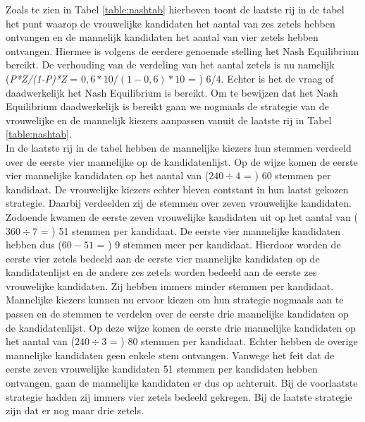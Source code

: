 Zoals te zien in Tabel \ref{table:nashtab} hierboven toont de laatste rij in de tabel het punt waarop de vrouwelijke kandidaten het aantal van zes zetels hebben ontvangen en de mannelijk kandidaten het aantal van vier zetels hebben ontvangen. Hiermee is volgens de eerdere genoemde stelling het Nash Equilibrium bereikt. De verhouding van de verdeling van het aantal zetels is nu namelijk (\textit{P*Z/(1-P)*Z} = $0,6*10/(1-0,6)*10$ = ) 6/4. Echter is het de vraag of daadwerkelijk het Nash Equilibrium is bereikt. Om te bewijzen dat het Nash Equilibrium daadwerkelijk is bereikt gaan we nogmaals de strategie van de vrouwelijke en de mannelijk kiezers aanpassen vanuit de laatste rij in Tabel \ref{table:nashtab}. \\
\indent In de laatste rij in de tabel hebben de mannelijke kiezers hun stemmen verdeeld over de eerste vier mannelijke op de kandidatenlijst. Op de wijze komen de eerste vier mannelijke kandidaten op het aantal van ($240\div4$ = ) 60 stemmen per kandidaat. De vrouwelijke kiezers echter bleven contstant in hun laatst gekozen strategie. Daarbij verdeelden zij de stemmen over zeven vrouwelijke kandidaten. Zodoende kwamen de eerste zeven vrouwelijke kandidaten uit op het aantal van ($360\div7$ = ) 51 stemmen per kandidaat. De eerste vier mannelijke kandidaten hebben dus ($60-51$ = ) 9 stemmen meer per kandidaat. Hierdoor worden de eerste vier zetels bedeeld aan de eerste vier mannelijke kandidaten op de kandidatenlijst en de andere zes zetels worden bedeeld aan de eerste zes vrouwelijke kandidaten. Zij hebben immers minder stemmen per kandidaat. \\
\indent Mannelijke kiezers kunnen nu ervoor kiezen om hun strategie nogmaals aan te passen en de stemmen te verdelen over de eerste drie mannelijke kandidaten op de kandidatenlijst. Op deze wijze komen de eerste drie mannelijke kandidaten op het aantal van ($240\div3$ = ) 80 stemmen per kandidaat. Echter hebben de overige mannelijke kandidaten geen enkele stem ontvangen. Vanwege het feit dat de eerste zeven vrouwelijke kandidaten 51 stemmen per kandidaten hebben ontvangen, gaan de mannelijke kandidaten er dus op achteruit. Bij de voorlaatste strategie hadden zij immers vier zetels bedeeld gekregen. Bij de laatste strategie zijn dat er nog maar drie zetels. \\
